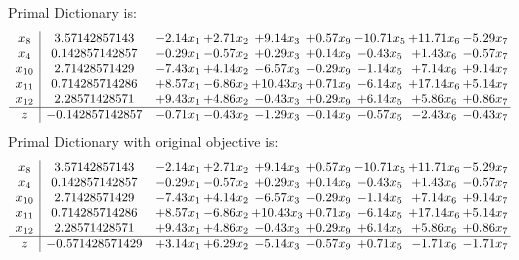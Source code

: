 \documentclass[8pt]{article}
\begin{document}
Primal Dictionary is:
\[\begin{array}{c| c c@{\hskip 2pt} c@{\hskip 2pt} c@{\hskip 2pt} c@{\hskip 2pt} c@{\hskip 2pt} c@{\hskip 2pt} c@{\hskip 2pt} }
 x_{8}   &  3.57142857143 & -2.14 x_{1} & +  2.71 x_{2} & +  9.14 x_{3} & +  0.57 x_{9} & -10.71 x_{5} & + 11.71 x_{6} & -5.29 x_{7}\\
 x_{4}   &  0.142857142857 & -0.29 x_{1} & -0.57 x_{2} & +  0.29 x_{3} & +  0.14 x_{9} & -0.43 x_{5} & +  1.43 x_{6} & -0.57 x_{7}\\
 x_{10}   &  2.71428571429 & -7.43 x_{1} & +  4.14 x_{2} & -6.57 x_{3} & -0.29 x_{9} & -1.14 x_{5} & +  7.14 x_{6} & +  9.14 x_{7}\\
 x_{11}   &  0.714285714286 & +  8.57 x_{1} & -6.86 x_{2} & + 10.43 x_{3} & +  0.71 x_{9} & -6.14 x_{5} & + 17.14 x_{6} & +  5.14 x_{7}\\
 x_{12}   &  2.28571428571 & +  9.43 x_{1} & +  4.86 x_{2} & -0.43 x_{3} & +  0.29 x_{9} & +  6.14 x_{5} & +  5.86 x_{6} & +  0.86 x_{7}\\
\hline
z    &  -0.142857142857 & -0.71 x_{1} & -0.43 x_{2} & -1.29 x_{3} & -0.14 x_{9} & -0.57 x_{5} & -2.43 x_{6} & -0.43 x_{7}\\
\end{array}\]
Primal Dictionary with original objective is:
\[\begin{array}{c| c c@{\hskip 2pt} c@{\hskip 2pt} c@{\hskip 2pt} c@{\hskip 2pt} c@{\hskip 2pt} c@{\hskip 2pt} c@{\hskip 2pt} }
 x_{8}   &  3.57142857143 & -2.14 x_{1} & +  2.71 x_{2} & +  9.14 x_{3} & +  0.57 x_{9} & -10.71 x_{5} & + 11.71 x_{6} & -5.29 x_{7}\\
 x_{4}   &  0.142857142857 & -0.29 x_{1} & -0.57 x_{2} & +  0.29 x_{3} & +  0.14 x_{9} & -0.43 x_{5} & +  1.43 x_{6} & -0.57 x_{7}\\
 x_{10}   &  2.71428571429 & -7.43 x_{1} & +  4.14 x_{2} & -6.57 x_{3} & -0.29 x_{9} & -1.14 x_{5} & +  7.14 x_{6} & +  9.14 x_{7}\\
 x_{11}   &  0.714285714286 & +  8.57 x_{1} & -6.86 x_{2} & + 10.43 x_{3} & +  0.71 x_{9} & -6.14 x_{5} & + 17.14 x_{6} & +  5.14 x_{7}\\
 x_{12}   &  2.28571428571 & +  9.43 x_{1} & +  4.86 x_{2} & -0.43 x_{3} & +  0.29 x_{9} & +  6.14 x_{5} & +  5.86 x_{6} & +  0.86 x_{7}\\
\hline
z    &  -0.571428571429 & +  3.14 x_{1} & +  6.29 x_{2} & -5.14 x_{3} & -0.57 x_{9} & +  0.71 x_{5} & -1.71 x_{6} & -1.71 x_{7}\\
\end{array}\]
\end{document}
